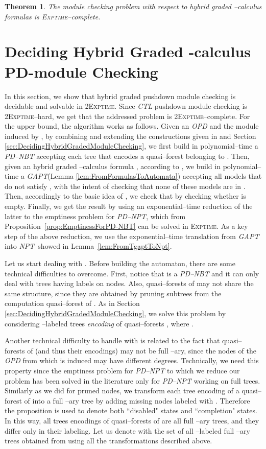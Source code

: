 \documentclass{LMCS}
\theoremstyle{plain}
\def \CTL           {\emph{CTL}\xspace}
\def \EXPTIME       {\textsc{Exptime}\xspace}
\def \GAPT          {\emph{GAPT}\xspace}
\def \NPT           {\emph{NPT}\xspace}
\def \OPD           {\emph{OPD}\xspace}
\def \PDNBT         {\emph{PD--NBT}\xspace}
\def \PDNPT         {\emph{PD--NPT}\xspace}
\def \TWOEXPTIME    {\textsc{2Exptime}\xspace}
\newtheorem{theorem}{Theorem}
\begin{document}
\begin{theorem}\label{the:HybridGradedFiniteStatesModuleChecking}
The module checking problem with respect to hybrid graded
--calculus formulas is \EXPTIME--complete.
\end{theorem}

\section{Deciding Hybrid Graded -calculus PD-module Checking}\label{sec:DecidingHybridGradedPushdownModuleChecking}
In this section, we show that hybrid graded pushdown module checking is
decidable and solvable in \TWOEXPTIME. Since \CTL pushdown module checking is
\TWOEXPTIME--hard, we get that the addressed problem is \TWOEXPTIME--complete.
For the upper bound, the algorithm works as follows. Given an \OPD  and the
module  induced by , by combining and extending the constructions
given in \cite{BMP05} and Section \ref{sec:DecidingHybridGradedModuleChecking},
we first build in polynomial--time a \PDNBT  accepting each tree that
encodes a quasi--forest belonging to . Then, given an hybrid
graded --calculus formula , according to \cite{BLMV06}, we build
in polynomial--time a \GAPT  (Lemma
\ref{lem:FromFormulasToAutomata}) accepting all models that do not satisfy
, with the intent of checking that none of these models are in
. Then, accordingly to the basic idea of \cite{KVW01}, we check
that  by checking whether  is empty. Finally, we get the result by using an
exponential--time reduction of the latter to the emptiness problem for \PDNPT,
which from Proposition~\ref{prop:EmptinessForPD-NBT} can be solved in \EXPTIME.
As a key step of the above reduction, we use the exponential--time translation
from \GAPT into \NPT\ showed in Lemma~\ref{lem:FromTgaptToNpt}.

Let us start dealing with . Before building the
automaton, there are some technical difficulties to overcome.
First, notice that  is a \PDNBT and it can only deal with
trees having labels on nodes. Also, quasi--forests of
 may not share the same structure, since they are
obtained by pruning subtrees from the computation quasi--forest
 of .
As in Section \ref{sec:DecidingHybridGradedModuleChecking}, we
solve this problem by considering  --labeled trees \emph{encoding} of
quasi--forests , where
.

Another technical difficulty to handle with is related to the fact
that quasi--forests of  (and thus their encodings)
may not be full --ary, since the nodes of the \OPD from which
 is induced may have different degrees. Technically, we
need this property since the emptiness problem for \PDNPT to which
we reduce our problem has been solved in the literature only for
\PDNPT working on full trees. Similarly as we did for pruned
nodes, we transform each tree encoding of a quasi--forest of
 into a full --ary tree by adding missing nodes
labeled with .
Therefore the proposition  is used to denote both
``disabled" states and ``completion" states. In this way, all
trees encodings of quasi--forests of  are all full
--ary trees, and they differ only in their labeling. Let us
denote with  the set of all --labeled full --ary trees obtained
from  using
all the transformations described above.
\end{document}
